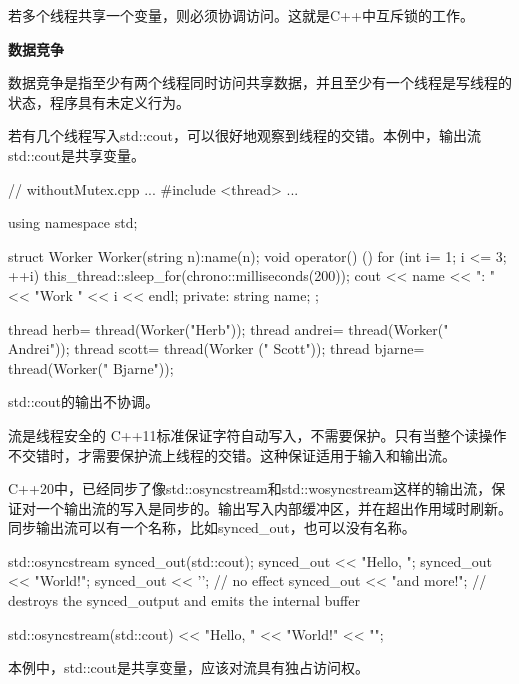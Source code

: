 若多个线程共享一个变量，则必须协调访问。这就是C++中互斥锁的工作。


\noindent
\textbf{数据竞争}

数据竞争是指至少有两个线程同时访问共享数据，并且至少有一个线程是写线程的状态，程序具有未定义行为。

若有几个线程写入std::cout，可以很好地观察到线程的交错。本例中，输出流std::cout是共享变量。


\begin{cpp}
// withoutMutex.cpp
...
#include <thread>
...

using namespace std;

struct Worker{
	Worker(string n):name(n){};
	void operator() (){
		for (int i= 1; i <= 3; ++i){
			this_thread::sleep_for(chrono::milliseconds(200));
			cout << name << ": " << "Work " << i << endl;
		}
	}
	private:
	string name;
};

thread herb= thread(Worker("Herb"));
thread andrei= thread(Worker(" Andrei"));
thread scott= thread(Worker ("     Scott"));
thread bjarne= thread(Worker("       Bjarne"));
\end{cpp}


std::cout的输出不协调。

\begin{myTip}{流是线程安全的}
C++11标准保证字符自动写入，不需要保护。只有当整个读操作不交错时，才需要保护流上线程的交错。这种保证适用于输入和输出流。

C++20中，已经同步了像std::osyncstream和std::wosyncstream这样的输出流，保证对一个输出流的写入是同步的。输出写入内部缓冲区，并在超出作用域时刷新。同步输出流可以有一个名称，比如synced\_out，也可以没有名称。


\begin{cpp}
{
	std::osyncstream synced_out(std::cout);
	synced_out << "Hello, ";
	synced_out << "World!";
	synced_out << '\n'; // no effect
	synced_out << "and more!\n";
} // destroys the synced_output and emits the internal buffer

std::osyncstream(std::cout) << "Hello, " << "World!" << "\n";
\end{cpp}
\end{myTip}

本例中，std::cout是共享变量，应该对流具有独占访问权。

